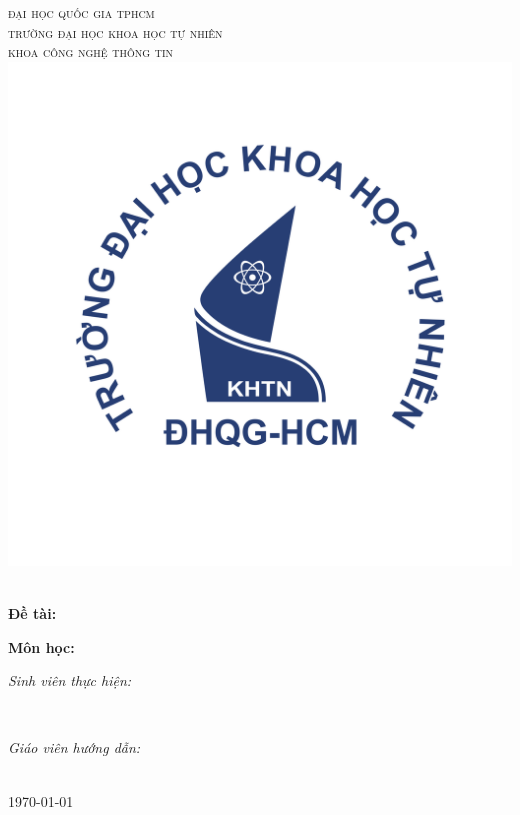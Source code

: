 \begin{titlepage}
\newcommand{\HRule}{\rule{\linewidth}{0.5mm}}
\centering

\textsc{\LARGE đại học quốc gia tphcm}\\[0.25cm]
\textsc{\LARGE trường đại học khoa học tự nhiên}\\[0.25cm]
\textsc{\LARGE khoa công nghệ thông tin}\\[0.25cm]

\includegraphics[scale=.25]{img/hcmus-logo.png}

\vspace*{\fill} %

{
\huge{\bfseries{\reporttitle}}\\[0.5cm]
\Large{\bfseries{Đề tài: \reportname}}
}\\[0.3cm]

\vspace*{\fill} %

\textbf{\large Môn học: \coursename}\\[0.5cm]

\begin{minipage}[t]{0.5\textwidth}
\begin{flushleft} \large
\emph{Sinh viên thực hiện:}\\
\studentname
\end{flushleft}
\end{minipage}
~
\begin{minipage}[t]{0.4\textwidth}
\begin{flushright} \large
\emph{Giáo viên hướng dẫn:} \\
\teachername
\end{flushright}
\end{minipage}\\[1cm]

{\large \today}\\[1cm]

\vfill
\end{titlepage}
